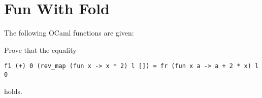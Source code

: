 \section{Fun With Fold}
The following OCaml functions are given:

Prove that the equality
\begin{center}
    \begin{lstlisting}
f1 (+) 0 (rev_map (fun x -> x * 2) l []) = fr (fun x a -> a + 2 * x) l 0\end{lstlisting}
\end{center}
holds.